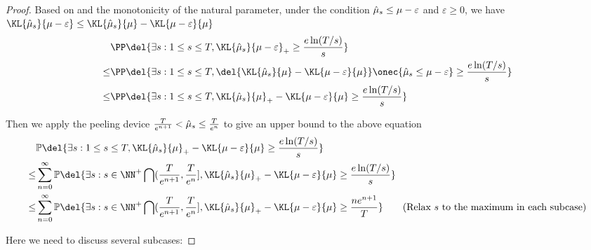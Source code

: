     \begin{proof}
        Based on  and the monotonicity of the natural parameter, under the condition ${\hat\mu}_s \leq \mu-\varepsilon$ and $\varepsilon \geq 0$, we have $\KL{\hmu_s}{\mu-\varepsilon} \leq \KL{\hmu_s}{\mu} - \KL{\mu-\varepsilon}{\mu}$
        \begin{align*}
            & \PP\del{\exists s: 1 \leq s \leq T,
                \KL{\hmu_s}{\mu-\varepsilon}_+ \geq \frac{e\ln(T/s)}{s}
            }
            \\
            \leq&
            \PP\del{\exists s: 1 \leq s \leq T,
                \del{\KL{\hmu_s}{\mu} - \KL{\mu-\varepsilon}{\mu}}\onec{\hmu_s \leq \mu-\varepsilon} \geq \frac{e\ln(T/s)}{s}
            }
            \\
            \leq&
            \PP\del{\exists s: 1 \leq s \leq T,
                \KL{\hmu_s}{\mu}_+ - \KL{\mu-\varepsilon}{\mu} \geq \frac{e\ln(T/s)}{s}
            }
        \end{align*}

        Then we apply the peeling device $\frac{T}{e^{n+1}} < {\hat\mu}_s \leq \frac{T}{e^n}$ to give an upper bound to the above equation
        \begin{align}
            & \mathbb{P}\del{
                \exists s: 1 \leq s \leq T,
                    \KL{\hmu_s}{\mu}_+ - \KL{\mu-\varepsilon}{\mu}  \geq \frac{e \ln( T/s )}{s}
                }
                    \nonumber
            \\
            \leq& \sum_{n=0}^\infty
                \mathbb{P}\del{
                \exists s:
                    s \in \NN^+ \bigcap (\frac{T}{e^{n+1}}, \frac{T}{e^n}],
                        \KL{\hmu_s}{\mu}_+ - \KL{\mu-\varepsilon}{\mu} \geq \frac{e \ln( T/s )}{s}
                }
                    \nonumber
            \\
            \leq& \sum_{n=0}^\infty
                \mathbb{P}\del{
                \exists s: 
                    s \in \NN^+ \bigcap (\frac{T}{e^{n+1}}, \frac{T}{e^n}],
                        \KL{\hmu_s}{\mu}_+ - \KL{\mu-\varepsilon}{\mu} \geq \frac{n e^{n+1}}{T}
                }
                        \tag{Relax $s$ to the maximum in each subcase}
            \\
                    \label{eqn:before-subcases-new}
            \end{align}
            
            Here we need to discuss several subcases: 


\end{proof}
